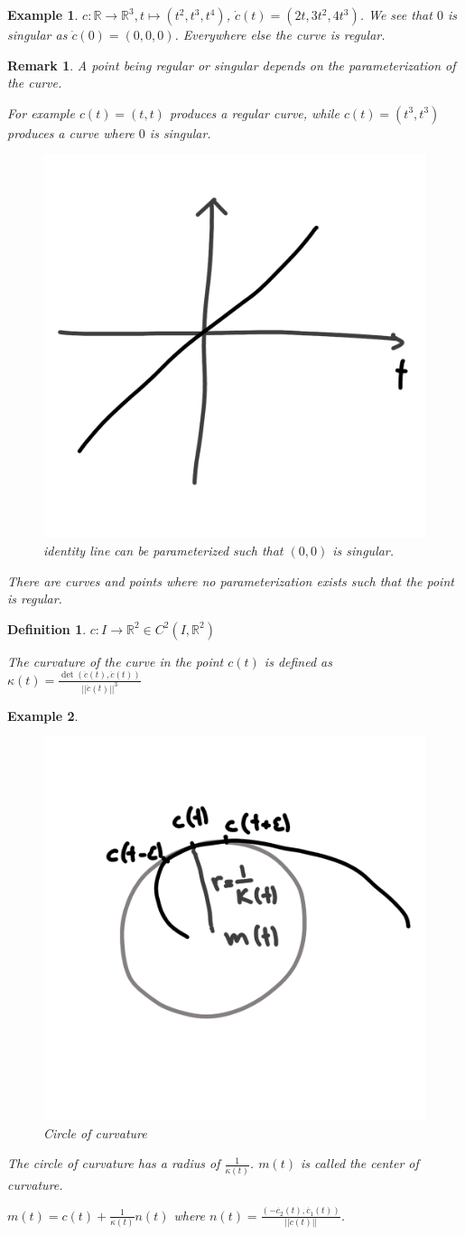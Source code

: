 \documentclass[]{article}
\newtheorem{definition}{Definition}
\newtheorem{example}{Example}
\newtheorem{remark}{Remark}
\begin{document}
\begin{example}
	$c:\mathbb{R} \rightarrow \mathbb{R}^3, t \mapsto (t^2, t^3, t^4)$, $\dot{c}(t) = (2t, 3t^2, 4t^3)$. We see that $0$ is singular as $\dot{c}(0) = (0, 0, 0)$. Everywhere else the curve is regular.
\end{example}

\begin{remark}
	A point being regular or singular depends on the parameterization of the curve.
	
	For example $c(t) = (t,t)$ produces a regular curve, while $c(t) = (t^3, t^3)$ produces a curve where $0$ is singular.
	
	
	\begin{figure}[h!]
		\centering
		\includegraphics[width=0.3\linewidth]{figures/identity_line}
		\caption{identity line can be parameterized such that $(0, 0)$ is singular.}
		\label{fig:identityline}
	\end{figure}
	
	
	There are curves and points where no parameterization exists such that the point is regular.	
\end{remark}

\begin{definition}
	$c: I \rightarrow \mathbb{R}^2 \in C^2(I, \mathbb{R}^2)$
	
	The curvature of the curve in the point $c(t)$ is defined as $\kappa(t) = \frac{\det(\dot{c}(t), \ddot{c}(t))}{||\dot{c}(t)||^3}$
\end{definition}

\begin{example}
	\begin{figure}[h!]
		\centering
		\includegraphics[width=0.3\linewidth]{figures/circle_of_curvature}
		\caption{Circle of curvature}
		\label{fig:circleofcurvature}
	\end{figure}
	
	The circle of curvature has a radius of $\frac{1}{\kappa(t)}$. $m(t)$ is called the center of curvature.
	
	$m(t) = c(t) + \frac{1}{\kappa(t)}n(t)$ where $n(t) = \frac{(-\dot{c_2}(t), \dot{c_1}(t))}{||\dot{c}(t)||}$.
\end{example}
\end{document}
